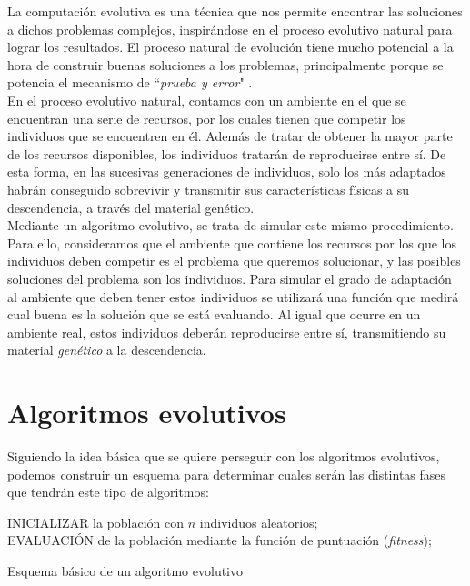 La computación evolutiva es una técnica que nos permite encontrar las soluciones a dichos problemas complejos, inspirándose en el proceso evolutivo natural para lograr los resultados. El proceso natural de evolución tiene mucho potencial a la hora de construir buenas soluciones a los problemas, principalmente porque se potencia el mecanismo de ``\textit{prueba y error}" \cite{holland1973genetic}. \\

En el proceso evolutivo natural, contamos con un ambiente en el que se encuentran una serie de recursos, por los cuales tienen que competir los individuos que se encuentren en él. Además de tratar de obtener la mayor parte de los recursos disponibles, los individuos tratarán de reproducirse entre sí. De esta forma, en las sucesivas generaciones de individuos, solo los más adaptados habrán conseguido sobrevivir y transmitir sus características físicas a su descendencia, a través del material genético. \\

Mediante un algoritmo evolutivo, se trata de simular este mismo procedimiento. Para ello, consideramos que el ambiente que contiene los recursos por los que los individuos deben competir es el problema que queremos solucionar, y las posibles soluciones del problema son los individuos. Para simular el grado de adaptación al ambiente que deben tener estos individuos se utilizará una función que medirá cual buena es la solución que se está evaluando. Al igual que ocurre en un ambiente real, estos individuos deberán reproducirse entre sí, transmitiendo su material \textit{genético} a la descendencia. \\

\section{Algoritmos evolutivos}
\label{1:sec:3}

Siguiendo la idea básica que se quiere perseguir con los algoritmos evolutivos, podemos construir un esquema para determinar cuales serán las distintas fases que tendrán este tipo de algoritmos:

\begin{algorithm}[H]
 INICIALIZAR la población con $n$ individuos aleatorios;\\
 EVALUACIÓN de la población mediante la función de puntuación (\textit{fitness});
 
 \caption{Esquema básico de un algoritmo evolutivo}
\end{algorithm}

